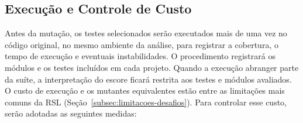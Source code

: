 \subsection{Execução e Controle de Custo}
\label{subsec:execucao-controle-custo}

Antes da mutação, os testes selecionados serão executados mais de uma vez no código original, no mesmo ambiente da análise, para registrar a cobertura, o tempo de execução e eventuais instabilidades. O procedimento registrará os módulos e os testes incluídos em cada projeto. Quando a execução abranger parte da suíte, a interpretação do escore ficará restrita aos testes e módulos avaliados. O custo de execução e os mutantes equivalentes estão entre as limitações mais comuns da RSL (Seção~\ref{subsec:limitacoes-desafios}). Para controlar esse custo, serão adotadas as seguintes medidas:

